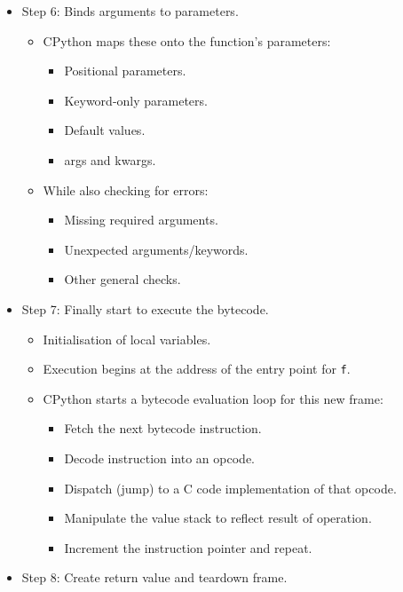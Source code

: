 \documentclass[10pt]{article}
\begin{document}
\begin{flushleft}
\begin{itemize}
        \item Step 6: Binds arguments to parameters.
        \begin{itemize}
            \item CPython maps these onto the function's parameters:
            \begin{itemize}
                \item Positional parameters.
                \item Keyword-only parameters.
                \item Default values.
                \item args and kwargs.
            \end{itemize}
            \item While also checking for errors:
            \begin{itemize}
                \item Missing required arguments.
                \item Unexpected arguments/keywords.
                \item Other general checks.
            \end{itemize}
        \end{itemize}
        \item Step 7: Finally start to execute the bytecode.
        \begin{itemize}
            \item Initialisation of local variables.
            \item Execution begins at the address of the entry point for \verb|f|.
            \item CPython starts a bytecode evaluation loop for this new frame:
            \begin{itemize}
                \item Fetch the next bytecode instruction.
                \item Decode instruction into an opcode.
                \item Dispatch (jump) to a C code implementation of that opcode.
                \item Manipulate the value stack to reflect result of operation.
                \item Increment the instruction pointer and repeat.
            \end{itemize}
        \end{itemize}
        \item Step 8: Create return value and teardown frame.

\end{itemize}
\end{flushleft}
\end{document}
